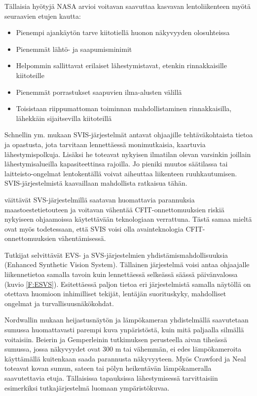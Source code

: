 \documentclass[utf8,bachelor,manualbib]{gradu3}
\begin{document}
Tällaisia hyötyjä NASA \citeyearpar{williamsym2001} arvioi voitavan saavuttaa kasvavan lentoliikenteen myötä seuraavien etujen kautta:

\begin{itemize}
\item Pienempi ajankäytön tarve kiitotiellä huonon näkyvyyden olosuhteissa
\item Pienemmät lähtö- ja saapumisminimit
\item Helpommin sallittavat erilaiset lähestymistavat, etenkin rinnakkaisille kiitoteille
\item Pienemmät porrastukset saapuvien ilma-alusten välillä
\item Toisistaan riippumattoman toiminnan mahdollistaminen rinnakkaisilla, lähekkäin sijaitsevilla kiitoteillä
\end{itemize} 

Schnellin ym. \citeyearpar{schnellym2004} mukaan SVIS-järjestelmät antavat ohjaajille tehtäväkohtaista tietoa ja opastusta, jota tarvitaan lennettäessä monimutkaisia, kaartuvia lähestymispolkuja. Lisäksi he toteavat nykyisen ilmatilan olevan varsinkin joillain lähestymisalueilla kapasiteettinsa rajoilla. Jo pieniki muutos säätilassa tai laitteisto-ongelmat lentokentällä voivat aiheuttaa liikenteen ruuhkautumisen. SVIS-järjestelmistä kaavaillaan mahdollista ratkaisua tähän.

\cite{baileyym2007} väittävät SVS-järjestelmillä saatavan huomattavia parannuksia maastoestetietouteen ja voitavan vähentää CFIT-onnettomuuksien riskiä nykyiseen ohjaamoissa käytettävään teknologiaan verrattuna. Tästä samaa mieltä ovat myös \cite{schnellym2004} todetessaan, että SVIS voisi olla avainteknologia CFIT-onnettomuuksien vähentämisessä.

Tutkijat selvittävät EVS- ja SVS-järjestelmien yhdistämismahdollisuuksia (Enhanced Synthetic Vision System). Tällainen järjestelmä voisi antaa ohjaajalle liikennetietoa samalla tavoin kuin lennettäessä selkeässä säässä päivänvalossa (kuvio \ref{F:ESVS}). Esitettäessä paljon tietoa eri järjestelmistä samalla näytöllä on otettava huomioon inhimilliset tekijät, lentäjän suorituskyky, mahdolliset ongelmat ja turvallisuusnäkökohdat. \citep{crawfordneal2006}

Nordwallin \citeyearpar{nordwall1993} mukaan heijastusnäytön ja lämpökameran yhdistelmällä saavutetaan sumussa huomattavasti parempi kuva ynpäristöstä, kuin mitä paljaalla silmällä voitaisiin. Beierin ja Gemperleinin \citeyearpar{beiergemperlein2004} tutkimuksen perusteella aivan tiheässä sumussa, jossa näkyvyydet ovat 300 m tai vähemmän, ei edes lämpökameroita käyttämällä kuitenkaan saada parannusta näkyvyyteen. Myös Crawford ja Neal \citeyearpar{crawfordneal2006} toteavat kovan sumun, sateen tai pölyn heikentävän lämpökameralla saavutettavia etuja. Tällaisissa tapauksissa lähestymisessä tarvittaisiin esimerkiksi tutkajärjestelmä luomaan ympäristökuvaa.
\end{document}
